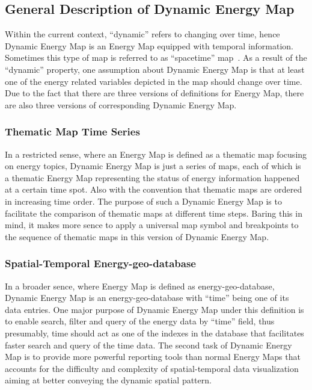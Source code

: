 \documentclass[hidelinks,12pt]{article}
\begin{document}
\subsection{General Description of Dynamic Energy Map}
Within the current context, ``dynamic'' refers to changing over time,
hence Dynamic Energy Map is an Energy Map equipped with temporal
information. Sometimes this type of map is referred to as
``spacetime'' map~\cite{Brownrigg2005}. As a result of the ``dynamic''
property, one assumption about Dynamic Energy Map is that at least one
of the energy related variables depicted in the map should change over
time. Due to the fact that there are three versions of definitions for
Energy Map, there are also three versions of corresponding Dynamic
Energy Map.

\subsubsection{Thematic Map Time Series}
In a restricted sense, where an Energy Map is defined as a thematic
map focusing on energy topics, Dynamic Energy Map is just a series of
maps, each of which is a thematic Energy Map representing the status
of energy information happened at a certain time spot. Also with the
convention that thematic maps are ordered in increasing time order.
The purpose of such a Dynamic Energy Map is to facilitate the
comparison of thematic maps at different time steps. Baring this in
mind, it makes more sence to apply a universal map symbol and
breakpoints to the sequence of thematic maps in this version of
Dynamic Energy Map.

\subsubsection{Spatial-Temporal Energy-geo-database}
In a broader sence, where Energy Map is defined as
energy-geo-database, Dynamic Energy Map is an energy-geo-database with
``time'' being one of its data entries. One major purpose of Dynamic
Energy Map under this definition is to enable search, filter and query
of the energy data by ``time'' field, thus presumably, time should act
as one of the indexes in the database that facilitates faster search
and query of the time data.  The second task of Dynamic Energy Map is
to provide more powerful reporting tools than normal Energy Maps that
accounts for the difficulty and complexity of spatial-temporal data
visualization aiming at better conveying the dynamic spatial
pattern.
\end{document}
